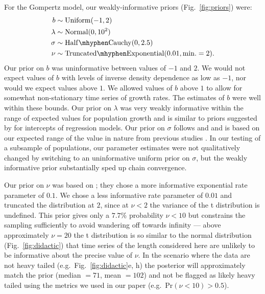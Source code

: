 For the Gompertz model, our weakly-informative priors (Fig.~\ref{fig:priors}) were:
\begin{align*}
b &\sim \mathrm{Uniform}(-1, 2)\\
\lambda &\sim \mathrm{Normal}(0, 10^2)\\
\sigma &\sim \mathrm{Half\mhyphen Cauchy} (0, 2.5)\\
\nu &\sim \mathrm{Truncated\mhyphen Exponential}(0.01, \mathrm{min.} = 2). \end{align*}
Our prior on $b$ was uninformative between values of $-1$ and $2$. We would not
expect values of $b$ with levels of inverse density dependence as low as $-1$,
nor would we expect values above $1$. We allowed values of $b$ above $1$ to
allow for somewhat non-stationary time series of growth rates. The estimates of
$b$ were well within these bounds. Our prior on $\lambda$ was very weakly
informative within the range of expected values for population growth and is
similar to priors suggested by \citet{gelman2008d} for intercepts of regression
models. Our prior on $\sigma$ follows \citet{gelman2006c} and
\citet{gelman2008d} and is based on our expected range of the value in nature
from previous studies \citep[e.g.][]{connors2014}. In our testing of a subsample
of populations, our parameter estimates were not qualitatively changed by
switching to an uninformative uniform prior on $\sigma$, but the weakly
informative prior substantially sped up chain convergence.

Our prior on $\nu$ was based on \citet{fernandez1998}; they chose a more
informative exponential rate parameter of $0.1$. We chose a less informative
rate parameter of $0.01$ and truncated the distribution at $2$, since at $\nu
< 2$ the variance of the t distribution is undefined. This prior gives only
a $7.7$\% probability $\nu < 10$ but constrains the sampling sufficiently to
avoid wandering off towards infinity --- above approximately $\nu = 20$ the
t distribution is so similar to the normal distribution
(Fig.~\ref{fig:didactic}) that time series of the length considered here are
unlikely to be informative about the precise value of $\nu$. In the
scenario where the data are not heavy tailed (e.g.~Fig.~\ref{fig:didactic}e, h)
the posterior will approximately match the prior (median $= 71$, mean $= 102$)
and not be flagged as likely heavy tailed using the metrics we used in our paper
(e.g.~Pr$(\nu < 10) > 0.5$).

